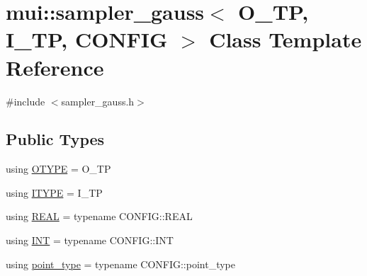 \hypertarget{classmui_1_1sampler__gauss}{}\section{mui\+:\+:sampler\+\_\+gauss$<$ O\+\_\+\+TP, I\+\_\+\+TP, C\+O\+N\+F\+IG $>$ Class Template Reference}
\label{classmui_1_1sampler__gauss}


{\ttfamily \#include $<$sampler\+\_\+gauss.\+h$>$}

\subsection*{Public Types}
\begin{DoxyCompactItemize}
\item 
using \hyperlink{classmui_1_1sampler__gauss_a315bd10f3854b5411bcb50c6250736e8}{O\+T\+Y\+PE} = O\+\_\+\+TP
\item 
using \hyperlink{classmui_1_1sampler__gauss_a3d12840af96d1e49b37ca6ceec0005e6}{I\+T\+Y\+PE} = I\+\_\+\+TP
\item 
using \hyperlink{classmui_1_1sampler__gauss_a35a01ac5eb1f9f41dc5642844a43366b}{R\+E\+AL} = typename C\+O\+N\+F\+I\+G\+::\+R\+E\+AL
\item 
using \hyperlink{classmui_1_1sampler__gauss_ad0e59c03d0d57ebc420c9d99a9c05bfa}{I\+NT} = typename C\+O\+N\+F\+I\+G\+::\+I\+NT
\item 
using \hyperlink{classmui_1_1sampler__gauss_aeae4228a569ecea463221e54dade2bcc}{point\+\_\+type} = typename C\+O\+N\+F\+I\+G\+::point\+\_\+type
\end{DoxyCompactItemize}
